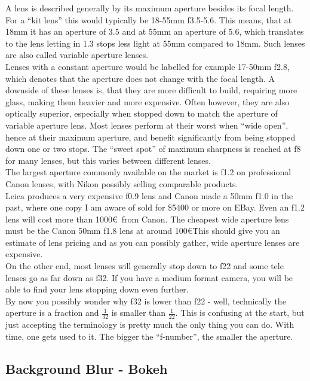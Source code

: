 A lens is described generally by its maximum aperture besides its focal length. For a ``kit lens'' this would typically be 18-55mm f3.5-5.6. This means, that at 18mm it has an \gls{aperture} of 3.5 and at 55mm an \gls{aperture} of 5.6, which translates to the lens letting in 1.3 \glspl{stop} less light at 55mm compared to 18mm. Such lenses are also called variable \gls{aperture} lenses.
\\[\baselineskip]
Lenses with a constant \gls{aperture} would be labelled for example 17-50mm f2.8, which denotes that the \gls{aperture} does not change with the focal length. A downside of these lenses is, that they are more difficult to build, requiring more glass, making them heavier and more expensive. Often however, they are also optically superior, especially when stopped down to match the \gls{aperture} of variable aperture lens. Most lenses perform at their worst when ``wide open'', hence at their maximum aperture, and benefit significantly from being stopped down one or two \glspl{stop}. The ``sweet spot'' of maximum sharpness is reached at f8 for many lenses, but this varies between different lenses.
\\[\baselineskip]
The largest \gls{aperture} commonly available on the market is f1.2 on professional Canon lenses, with Nikon possibly selling comparable products.
\\
Leica produces a very expensive f0.9 lens and Canon made a 50mm f1.0 in the past, where one copy I am aware of sold for \$5400 or more on EBay. Even an f1.2 lens will cost more than 1000\euro\ from Canon. The cheapest wide \gls{aperture} lens must be the Canon 50mm f1.8 lens at around 100\euro\. This should give you an estimate of lens pricing and as you can possibly gather, wide \gls{aperture} lenses are expensive.
\\
On the other end, most lenses will generally stop down to f22 and some tele lenses go as far down as f32. If you have a medium format camera, you will be able to find your lens stopping down even further.
\\[\baselineskip]
By now you possibly wonder why f32 is lower than f22 - well, technically the \gls{aperture} is a fraction and $\frac{1}{32}$ is smaller than $\frac{1}{22}$. This is confusing at the start, but just accepting the terminology is pretty much the only thing you can do. With time, one gets used to it. The bigger the ``f-number'', the smaller the \gls{aperture}.

\subsection{Background Blur - Bokeh}
\label{subsec:bokeh}

